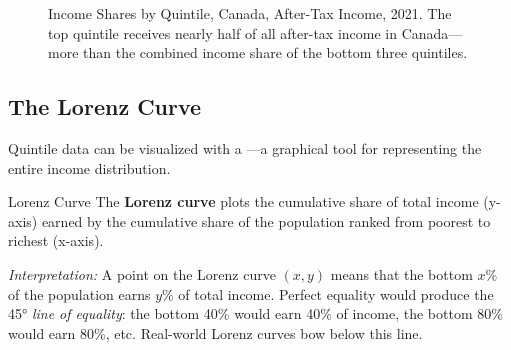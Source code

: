 \begin{figure}[H]
\centering
{}
\caption{Income Shares by Quintile, Canada, After-Tax Income, 2021. The top quintile
  receives nearly half of all after-tax income in Canada---more than the combined
  income share of the bottom three quintiles.}
\label{fig:quintile_shares}
\end{figure}

\subsection{The Lorenz Curve}

Quintile data can be visualized with a ---a graphical tool for representing the entire income distribution.

\begin{defbox}{Lorenz Curve}
The \textbf{Lorenz curve} plots the cumulative share of total income (y-axis) earned by the cumulative share of the population ranked from poorest to richest (x-axis).

\textit{Interpretation:} A point on the Lorenz curve $(x, y)$ means that the bottom $x$\% of the population earns $y$\% of total income. Perfect equality would produce the 45° \textit{line of equality}: the bottom 40\% would earn 40\% of income, the bottom 80\% would earn 80\%, etc. Real-world Lorenz curves bow below this line.
\end{defbox}

